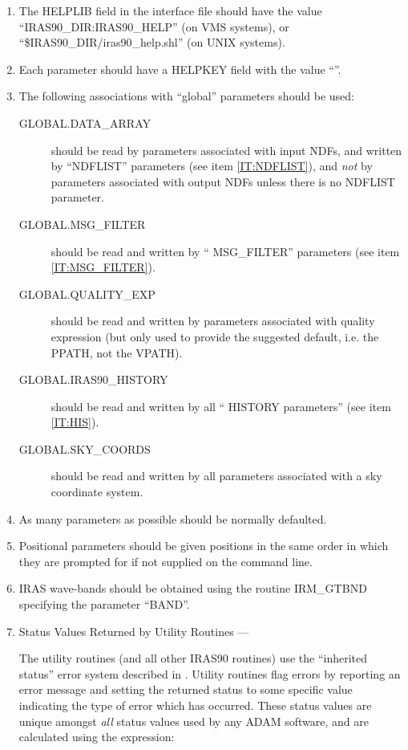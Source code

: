 \documentclass[twoside,11pt,nolof]{starlink}
\providecommand{\lsk}{\raisebox{-0.4ex}{\rm *}}
\begin{document}
\begin{enumerate}
\item The {\small HELPLIB} field in the interface file should have the value
``{\small IRAS90\_DIR:IRAS90\_HELP}'' (on {\small VMS} systems), or
``{\small \$IRAS90\_DIR/iras90\_help.shl}'' (on {\small UNIX} systems).

\item Each parameter should have a {\small HELPKEY} field with the value
``\lsk''.

\item The following associations with ``global'' parameters should be used:
\begin{description}
\item [GLOBAL.DATA\_ARRAY ] should be read by parameters associated with input
{\small NDF}s, and written by ``{\small NDFLIST}'' parameters (see item
\ref{IT:NDFLIST}), and \emph{not} by parameters associated with output {\small
NDF}s unless there is no {\small NDFLIST} parameter.
\item [GLOBAL.MSG\_FILTER ] should be read and written by ``{\small
MSG\_FILTER}'' parameters (see item \ref{IT:MSG_FILTER}).
\item [GLOBAL.QUALITY\_EXP ] should be read and written by parameters associated
with quality expression (but only used to provide the suggested default, i.e.
the {\small PPATH}, not the {\small VPATH}).
\item [GLOBAL.IRAS90\_HISTORY] should be read and written by all ``{\small
HISTORY} parameters'' (see item \ref{IT:HIS}).
\item [GLOBAL.SKY\_COORDS] should be read and written by all parameters
associated with a sky coordinate system.
\end{description}

\item As many parameters as possible should be normally defaulted.

\item Positional parameters should be given positions in the same order in which
they are prompted for if not supplied on the command line.

\item {\small IRAS} wave-bands should be obtained using the routine {\small
IRM\_GTBND} specifying the parameter ``{\small BAND}''.

\item Status Values Returned by Utility Routines ---

The utility routines (and all other {\small IRAS90} routines) use the
``inherited status'' error system described in
. Utility routines flag
errors by reporting an error message and setting the returned status to some
specific value indicating the type of error which has occurred. These status
values are unique amongst \emph{all} status values used by any {\small ADAM}
software, and are calculated using the expression:


\end{enumerate}
\end{document}
